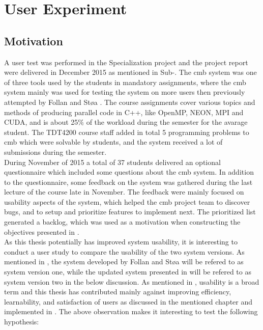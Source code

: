 \section{User Experiment}
\label{sec:user-testing}

\subsection{Motivation}
A user test was performed in the Specialization project and the project report were delivered in December 2015 as mentioned in Sub-. The \gls{cmb} system was one of three tools used by the students in mandatory assignments, where the \gls{cmb} system mainly was used for testing the system on more users then previously attempted by Follan and Støa \cite{mt:T&S}. The course assignments cover various topics and methods of producing parallel code in C++, like OpenMP, NEON, MPI and CUDA, and is about 25\% of the workload during the semester for the avarage student. The TDT4200 course staff added in total 5 programming problems to \gls{cmb} which were solvable by students, and the system received a lot of submissions during the semester. \\

During November of 2015 a total of 37 students delivered an optional questionnaire which included some questions about the \gls{cmb} system. In addition to the questionnaire, some feedback on the system was gathered during the last lecture of the course late in November. The feedback were mainly focused on usability aspects of the system, which helped the \gls{cmb} project team to discover bugs, and to setup and prioritize features to implement next. The prioritized list generated a backlog, which was used as a motivation when constructing the objectives presented in . \\

As this thesis potentially has improved system usability, it is interesting to conduct a user study to compare the usability of the two system versions. As mentioned in , the system developed by Follan and Støa will be refered to as system version one, while the updated system presented in  will be refered to as system version two in the below discussion. As mentioned in , usability is a broad term and this thesis has contributed mainly against improving efficiency, learnability, and satisfaction of users as discussed in the mentioned chapter and implemented in . The above observation makes it interesting to test the following hypothesis:

